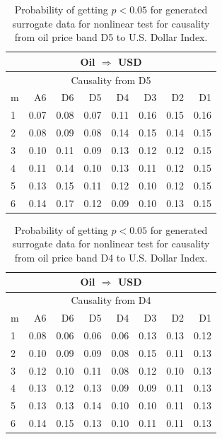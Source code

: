 %
%
\begin{table}[H]
\begin{center}
\begin{tabular}{l|r r r r r r r}
\hline\hline
\multicolumn{8}{c}{Oil $\Rightarrow$ USD}\\
\hline
\multicolumn{8}{c}{Causality from D5}\\
\hline\hline
m & A6 & D6 & D5 & D4 & D3 & D2 & D1 \\
\hline
1 & 0.07 & 0.08 & 0.07 & 0.11 & 0.16 & 0.15 & 0.16 \\
2 & 0.08 & 0.09 & 0.08 & 0.14 & 0.15 & 0.14 & 0.15 \\
3 & 0.10 & 0.11 & 0.09 & 0.13 & 0.12 & 0.12 & 0.15 \\
4 & 0.11 & 0.14 & 0.10 & 0.13 & 0.11 & 0.12 & 0.15 \\
5 & 0.13 & 0.15 & 0.11 & 0.12 & 0.10 & 0.12 & 0.15 \\
6 & 0.14 & 0.17 & 0.12 & 0.09 & 0.10 & 0.13 & 0.15 \\
\hline\hline
\end{tabular}
\caption{Probability of getting $p < 0.05$ for generated surrogate data for nonlinear test for causality from oil price band D5 to U.S. Dollar Index.}
\end{center}
\end{table}

%
%
\begin{table}[H]
\begin{center}
\begin{tabular}{l|r r r r r r r}
\hline\hline
\multicolumn{8}{c}{Oil $\Rightarrow$ USD}\\
\hline
\multicolumn{8}{c}{Causality from D4}\\
\hline\hline
m & A6 & D6 & D5 & D4 & D3 & D2 & D1 \\
\hline
1 & 0.08 & 0.06 & 0.06 & 0.06 & 0.13 & 0.13 & 0.12 \\
2 & 0.10 & 0.09 & 0.09 & 0.08 & 0.15 & 0.11 & 0.13 \\
3 & 0.12 & 0.10 & 0.11 & 0.08 & 0.12 & 0.10 & 0.13 \\
4 & 0.13 & 0.12 & 0.13 & 0.09 & 0.09 & 0.11 & 0.13 \\
5 & 0.13 & 0.13 & 0.14 & 0.10 & 0.10 & 0.11 & 0.13 \\
6 & 0.14 & 0.15 & 0.13 & 0.10 & 0.11 & 0.11 & 0.13 \\
\hline\hline
\end{tabular}
\caption{Probability of getting $p < 0.05$ for generated surrogate data for nonlinear test for causality from oil price band D4 to U.S. Dollar Index.}
\end{center}
\end{table}

